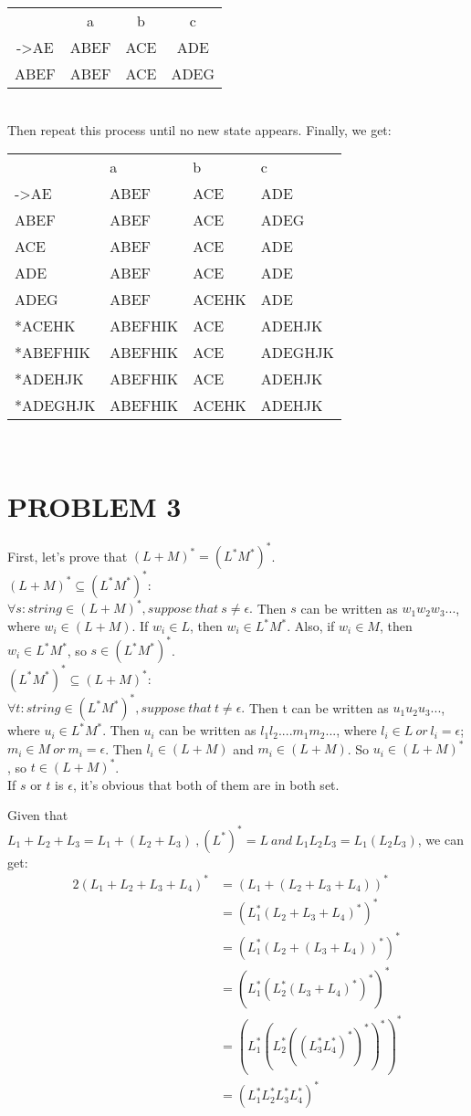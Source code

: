 \documentclass{ctexart}
\begin{document}
\begin{tabular}{cccc}
	     & a    & b   & c    \\
	->AE & ABEF & ACE & ADE  \\
	ABEF & ABEF & ACE & ADEG \\
\end{tabular}\\
Then repeat this process until no new state appears. Finally, we get:\\
\begin{tabular}{llll}
	         & a       & b     & c       \\
	->AE     & ABEF    & ACE   & ADE     \\
	ABEF     & ABEF    & ACE   & ADEG    \\
	ACE      & ABEF    & ACE   & ADE     \\
	ADE      & ABEF    & ACE   & ADE     \\
	ADEG     & ABEF    & ACEHK & ADE     \\
	*ACEHK   & ABEFHIK & ACE   & ADEHJK  \\
	*ABEFHIK & ABEFHIK & ACE   & ADEGHJK \\
	*ADEHJK  & ABEFHIK & ACE   & ADEHJK  \\
	*ADEGHJK & ABEFHIK & ACEHK & ADEHJK  \\
\end{tabular}\\

\section{PROBLEM 3}
First, let's prove that $(L+M)^*=(L^*M^*)^*$.\\

$(L+M)^*\subseteq(L^*M^*)^*$:\\
$\forall s:string \in (L+M)^*, suppose\ that\ s \ne \epsilon.$
Then $s$ can be written as $w_1w_2w_3...$, where $w_i \in (L+M)$.
If $w_i \in L$, then $w_i \in L^*M^*$.
Also, if $w_i \in M$, then $w_i \in L^*M^*$, so $s \in (L^*M^*)^*$.\\
$(L^*M^*)^*\subseteq(L+M)^*$:\\
$\forall t:string \in (L^*M^*)^*, suppose\ that\ t \ne \epsilon.$
Then t can be written as $u_1u_2u_3...$, where $u_i \in L^*M^*$.
Then $u_i$ can be written as $l_1l_2....m_1m_2...$, where $l_i \in L\ or\ l_i=\epsilon$;
$m_i \in M \ or\ m_i=\epsilon$. Then $l_i \in (L+M)$ and $m_i \in (L+M)$. 
So $u_i \in (L+M)^*$, so $t \in (L+M)^*$. \\
If $s$ or $t$ is $\epsilon$, it's obvious that both of them are in both set.

Given that $L_1+L_2+L_3=L_1+(L_2+L_3)\ ,(L^*)^*=L\ and\ L_1L_2L_3=L_1(L_2L_3) $, we can get:\\
\begin{alignat*}{2}
	(L_1+L_2+L_3+L_4)^*&=(L_1+(L_2+L_3+L_4))^*\\
	&=(L_1^*(L_2+L_3+L_4)^*)^*\\
	&=(L_1^*(L_2+(L_3+L_4))^*)^*\\
	&=(L_1^*(L_2^*(L_3+L_4)^*)^*)^*\\
	&=(L_1^*(L_2^*((L_3^*L_4^*)^*)^*)^*)^*\\
	&=(L_1^*L_2^*L_3^*L_4^*)^*
\end{alignat*}
\end{document}
